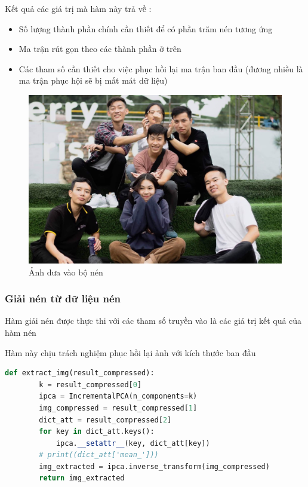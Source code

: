 Kết quả các giá trị mà hàm này trả về :
\begin{itemize}
    \item Số lượng thành phần chính cần thiết để có phần trăm nén tương ứng
    \item Ma trận rút gọn theo các thành phần ở trên
    \item Các tham số cần thiết cho việc phục hồi lại ma trận ban đầu (đương nhiều là ma trận phục hội sẽ bị mất mát dữ liệu)
\end{itemize}

\begin{center}
    \begin{figure}[htp]
        \begin{center}
            \includegraphics[width=\textwidth,height=\textheight,keepaspectratio]{Chapters/content/27_pca/imgg_origin.jpg}
        \end{center}
        \caption{Ảnh đưa vào bộ nén}
        \label{fig:27_7}
    \end{figure}
\end{center}

\subsubsection{Giải nén từ dữ liệu nén}

Hàm giải nén được thực thi với các tham số truyền vào là các giá trị kết quả của hàm nén

Hàm này chịu trách nghiệm phục hồi lại ảnh với kích thước ban đầu

\begin{lstlisting}[language=Python]
    def extract_img(result_compressed):
        k = result_compressed[0]
        ipca = IncrementalPCA(n_components=k)
        img_compressed = result_compressed[1]
        dict_att = result_compressed[2]
        for key in dict_att.keys():
            ipca.__setattr__(key, dict_att[key])
        # print((dict_att['mean_']))
        img_extracted = ipca.inverse_transform(img_compressed)
        return img_extracted
    
\end{lstlisting}

